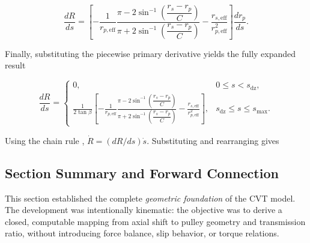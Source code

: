 \documentclass[11pt]{article}
\numberwithin{equation}{section}
\begin{document}
\begin{equation}
\frac{dR}{ds}
=
\left[
-
\frac{1}{r_{p,\mathrm{eff}}}
\frac{
\pi - 2\sin^{-1}\!\left(\dfrac{r_s-r_p}{C}\right)
}{
\pi + 2\sin^{-1}\!\left(\dfrac{r_s-r_p}{C}\right)
}
-
\frac{r_{s,\mathrm{eff}}}{r_{p,\mathrm{eff}}^2}
\right]
\frac{dr_p}{ds}.
\label{eq:dRds_subbed_all}
\end{equation}

Finally, substituting the piecewise primary derivative 
yields the fully expanded result

\begin{equation}
\frac{dR}{ds}
=
\begin{cases}
0,
& 0 \le s < s_{\mathrm{dz}}, \\[14pt]
\displaystyle
\frac{1}{2\tan\beta}
\left[
-
\frac{1}{r_{p,\mathrm{eff}}}
\frac{
\pi - 2\sin^{-1}\!\left(\dfrac{r_s-r_p}{C}\right)
}{
\pi + 2\sin^{-1}\!\left(\dfrac{r_s-r_p}{C}\right)
}
-
\frac{r_{s,\mathrm{eff}}}{r_{p,\mathrm{eff}}^2}
\right],
& s_{\mathrm{dz}} \le s \le s_{\max}.
\end{cases}
\label{eq:dRds_final}
\end{equation}

Using the chain rule , $\dot R = (dR/ds)\dot s$. Substituting
 and rearranging gives


\subsection{Section Summary and Forward Connection}
\label{sec:geometry_summary}

This section established the complete \emph{geometric foundation} of the CVT model.
The development was intentionally kinematic: the objective was to derive a closed,
computable mapping from axial shift to pulley geometry and transmission ratio, without
introducing force balance, slip behavior, or torque relations.
\end{document}
